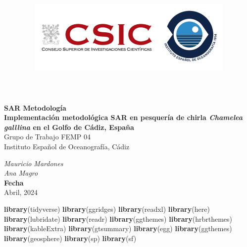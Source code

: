 \documentclass[
]{article}
\title{\includegraphics[width=10cm,height=\textheight]{IEO-logo2.png}}
\author{}
\date{\vspace{-2.5em}}
\newenvironment{Shaded}{\begin{snugshade}}{\end{snugshade}}
\newcommand{\FunctionTok}[1]{\textcolor[rgb]{0.13,0.29,0.53}{\textbf{#1}}}
\newcommand{\NormalTok}[1]{#1}
\begin{document}
\maketitle



\begin{flushleft}
\Large{\textbf{SAR Metodología}}\\
\vspace*{2\baselineskip}
\LARGE{\textbf{Implementación metodológica SAR en pesquería de chirla \textit{Chamelea galllina} en el Golfo de Cádiz, España}}\\
\vspace*{5\baselineskip}
\Large{Grupo de Trabajo FEMP 04}\\
\vspace*{1\baselineskip}
\Large{Instituto Español de Oceanografía, Cádiz }\\
\vspace*{4\baselineskip}
\end{flushleft}
\begin{flushright}
\large{\textit{Mauricio Mardones}}\\
\large{\textit{Ana Magro}}\\
\vspace*{1\baselineskip}
\normalsize{\textbf{Fecha}}\\
Abril, 2024
\end{flushright}



\hypersetup{linkcolor = black}
\newpage
{}

\newpage



\hypersetup{linkcolor = blue}

{
\hypersetup{linkcolor=}
\setcounter{tocdepth}{3}
\tableofcontents
}
\newpage

\begin{Shaded}
\begin{Highlighting}[]
\FunctionTok{library}\NormalTok{(tidyverse)}
\FunctionTok{library}\NormalTok{(ggridges)}
\FunctionTok{library}\NormalTok{(readxl)}
\FunctionTok{library}\NormalTok{(here)}
\FunctionTok{library}\NormalTok{(lubridate)}
\FunctionTok{library}\NormalTok{(readr)}
\FunctionTok{library}\NormalTok{(ggthemes)}
\FunctionTok{library}\NormalTok{(hrbrthemes)}
\FunctionTok{library}\NormalTok{(kableExtra)}
\FunctionTok{library}\NormalTok{(gtsummary)}
\FunctionTok{library}\NormalTok{(egg)}
\FunctionTok{library}\NormalTok{(ggthemes)}
\FunctionTok{library}\NormalTok{(geosphere)}
\FunctionTok{library}\NormalTok{(sp)}
\FunctionTok{library}\NormalTok{(sf)}
\end{Highlighting}
\end{Shaded}
\end{document}
